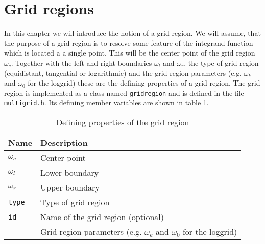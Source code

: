 \section{Grid regions}\label{sec:grid_regions}
In this chapter we will introduce the notion of a grid region. We will assume, that the purpose of a grid region is to resolve some feature of the integrand function which is located a a single point. This will be the center point of the grid region $\omega_c$. Together with the left and right boundaries $\omega_l$ and $\omega_r$, the type of grid region (equidistant, tangential or logarithmic) and the grid region parameters (e.g. $\omega_k$ and $\omega_0$ for the loggrid) these are the defining properties of a grid region. The grid region is implemented as a class named \texttt{gridregion} and is defined in the file \texttt{multigrid.h}. Its defining member variables are shown in table \ref{tab:grid_region_defining_members}.
\begin{table}[h]
	\begin{center}
		\begin{tabular}{ll}
		Name & Description \\ 
		\hline
		$\omega_c$  & Center point \\
		$\omega_l$  & Lower boundary \\
		$\omega_r$  & Upper boundary \\
		\texttt{type}  & Type of grid region \\
		\texttt{id}  & Name of the grid region (optional) \\
		 & Grid region parameters (e.g. $\omega_k$ and $\omega_0$ for the loggrid) \\
		\end{tabular}
	\end{center}
	\caption{Defining properties of the grid region}
	\label{tab:grid_region_defining_members}
\end{table}


